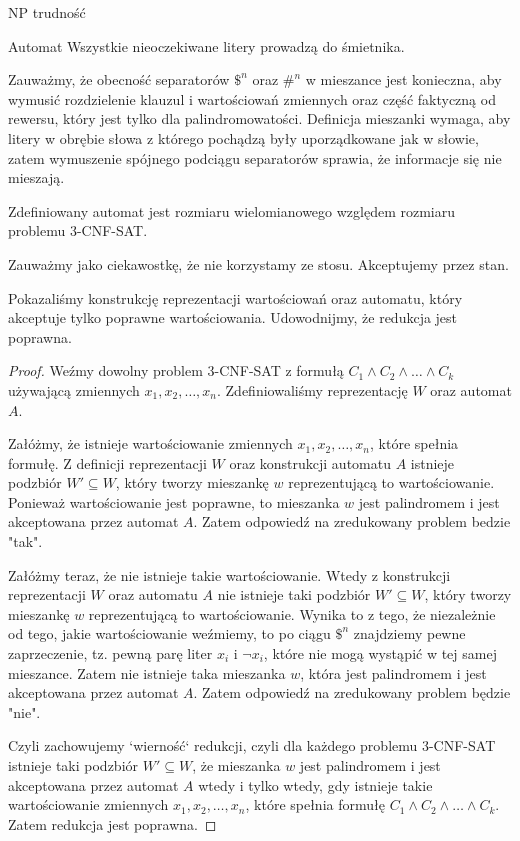 \documentclass{article}
\theoremstyle{definition}
\theoremstyle{remark}
\begin{document}
\begin{section}{NP trudność}
\begin{subsection}{Automat}
     Wszystkie nieoczekiwane litery prowadzą do śmietnika.

     Zauważmy, że obecność separatorów $ \$^n $ oraz $ \#^n $ w mieszance jest
     konieczna, aby wymusić rozdzielenie klauzul i wartościowań zmiennych oraz część
     faktyczną od rewersu, który jest tylko dla palindromowatości. Definicja
     mieszanki wymaga, aby litery w obrębie słowa z którego pochądzą były
     uporządkowane jak w słowie, zatem wymuszenie spójnego podciągu separatorów
     sprawia, że informacje się nie mieszają.

     Zdefiniowany automat jest rozmiaru wielomianowego względem rozmiaru problemu
     3-CNF-SAT.

     Zauważmy jako ciekawostkę, że nie korzystamy ze stosu. Akceptujemy przez stan.
 \end{subsection}

 Pokazaliśmy konstrukcję reprezentacji wartościowań oraz automatu, który
 akceptuje tylko poprawne wartościowania. Udowodnijmy, że redukcja jest
 poprawna.

 \begin{proof}

     Weźmy dowolny problem 3-CNF-SAT z formułą $C_1 \land C_2 \land \ldots \land
         C_k$ używającą zmiennych $x_1, x_2, \ldots, x_n$. Zdefiniowaliśmy reprezentację
     $W$ oraz automat $A$.

     Załóżmy, że istnieje wartościowanie zmiennych $x_1, x_2, \ldots, x_n$, które
     spełnia formułę. Z definicji reprezentacji $W$ oraz konstrukcji automatu $A$
     istnieje podzbiór $W' \subseteq W$, który tworzy mieszankę $w$ reprezentującą
     to wartościowanie. Ponieważ wartościowanie jest poprawne, to mieszanka $w$ jest
     palindromem i jest akceptowana przez automat $A$. Zatem odpowiedź na
     zredukowany problem bedzie "tak".

     Załóżmy teraz, że nie istnieje takie wartościowanie. Wtedy z konstrukcji
     reprezentacji $W$ oraz automatu $A$ nie istnieje taki podzbiór $W' \subseteq
         W$, który tworzy mieszankę $w$ reprezentującą to wartościowanie. Wynika to z
     tego, że niezależnie od tego, jakie wartościowanie weźmiemy, to po ciągu $ \$^n
     $ znajdziemy pewne zaprzeczenie, tz. pewną parę liter $ x_i $ i $ \neg x_i $,
     które nie mogą wystąpić w tej samej mieszance. Zatem nie istnieje taka
     mieszanka $w$, która jest palindromem i jest akceptowana przez automat $A$.
     Zatem odpowiedź na zredukowany problem będzie "nie".

     Czyli zachowujemy `wierność` redukcji, czyli dla każdego problemu 3-CNF-SAT
     istnieje taki podzbiór $W' \subseteq W$, że mieszanka $w$ jest palindromem i
     jest akceptowana przez automat $A$ wtedy i tylko wtedy, gdy istnieje takie
     wartościowanie zmiennych $x_1, x_2, \ldots, x_n$, które spełnia formułę $C_1
         \land C_2 \land \ldots \land C_k$. Zatem redukcja jest poprawna.

 \end{proof}

\end{section}
\end{document}
